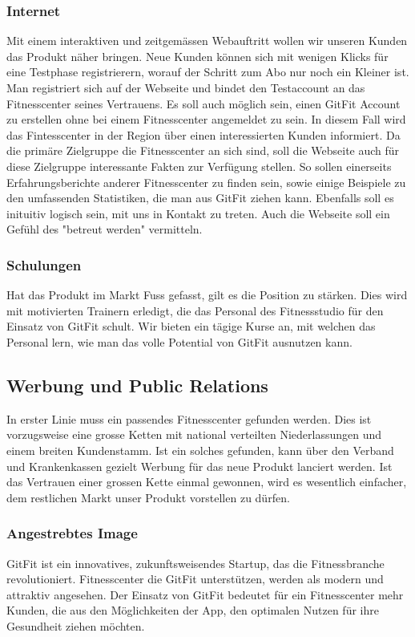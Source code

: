 \subsubsection{Internet} 
Mit einem interaktiven und zeitgemässen Webauftritt wollen wir unseren Kunden das Produkt näher bringen. Neue Kunden können sich mit wenigen Klicks für eine Testphase registrierern, worauf der Schritt zum Abo nur noch ein Kleiner ist. Man registriert sich auf der Webseite und bindet den Testaccount an das Fitnesscenter seines Vertrauens. Es soll auch möglich sein, einen GitFit Account zu erstellen ohne bei einem Fitnesscenter angemeldet zu sein. In diesem Fall wird das Fintesscenter in der Region über einen interessierten Kunden informiert. Da die primäre Zielgruppe die Fitnesscenter an sich sind, soll die Webseite auch für diese Zielgruppe interessante Fakten zur Verfügung stellen. So sollen einerseits Erfahrungsberichte anderer Fitnesscenter zu finden sein, sowie einige Beispiele zu den umfassenden Statistiken, die man aus GitFit ziehen kann. Ebenfalls soll es inituitiv logisch sein, mit uns in Kontakt zu treten. Auch die Webseite soll ein Gefühl des "betreut werden" vermitteln.

\subsubsection{Schulungen}
Hat das Produkt im Markt Fuss gefasst, gilt es die Position zu stärken. Dies wird mit motivierten Trainern erledigt, die das Personal des Fitnessstudio für den Einsatz von GitFit schult. Wir bieten ein tägige Kurse an, mit welchen das Personal lern, wie man das volle Potential von GitFit ausnutzen kann.

\clearpage

\subsection{Werbung und Public Relations}
In erster Linie muss ein passendes Fitnesscenter gefunden werden. Dies ist vorzugsweise eine grosse Ketten mit national verteilten Niederlassungen und einem breiten Kundenstamm. Ist ein solches gefunden, kann über den Verband und Krankenkassen gezielt Werbung für das neue Produkt lanciert werden. Ist das Vertrauen einer grossen Kette einmal gewonnen, wird es wesentlich einfacher, dem restlichen Markt unser Produkt vorstellen zu dürfen.

\subsubsection{Angestrebtes Image}
GitFit ist ein innovatives, zukunftsweisendes Startup, das die Fitnessbranche revolutioniert. Fitnesscenter die GitFit unterstützen, werden als modern und attraktiv angesehen. Der Einsatz von GitFit bedeutet für ein Fitnesscenter mehr Kunden, die aus den Möglichkeiten der App, den optimalen Nutzen für ihre Gesundheit ziehen möchten.

